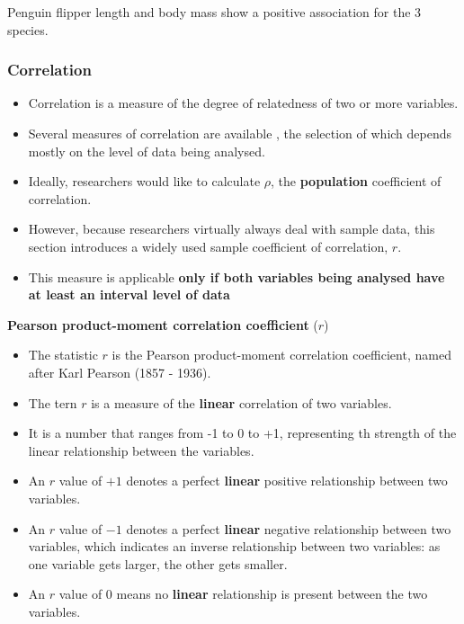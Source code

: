 \documentclass[]{book}
\providecommand{\tightlist}{%
  \setlength{\itemsep}{0pt}\setlength{\parskip}{0pt}}
\begin{document}
Penguin flipper length and body mass show a positive association for the 3 species.

\hypertarget{correlation-1}{%
\subsubsection{Correlation}\label{correlation-1}}

\begin{itemize}
\tightlist
\item
  Correlation is a measure of the degree of relatedness of two or more variables.
\item
  Several measures of correlation are available , the selection of which depends mostly on the level of data being analysed.
\item
  Ideally, researchers would like to calculate \(\rho\), the \textbf{population} coefficient of correlation.
\item
  However, because researchers virtually always deal with sample data, this section introduces a widely used sample coefficient of correlation, \(r\).
\item
  This measure is applicable \textbf{only if both variables being analysed have at least an interval level of data}
\end{itemize}

\textbf{Pearson product-moment correlation coefficient} (\(r\))

\begin{itemize}
\tightlist
\item
  The statistic \(r\) is the Pearson product-moment correlation coefficient, named after Karl Pearson (1857 - 1936).
\item
  The tern \(r\) is a measure of the \textbf{linear} correlation of two variables.
\item
  It is a number that ranges from -1 to 0 to +1, representing th strength of the linear relationship between the variables.
\item
  An \(r\) value of \(+1\) denotes a perfect \textbf{linear} positive relationship between two variables.
\item
  An \(r\) value of \(-1\) denotes a perfect \textbf{linear} negative relationship between two variables, which indicates an inverse relationship between two variables: as one variable gets larger, the other gets smaller.
\item
  An \(r\) value of 0 means no \textbf{linear} relationship is present between the two variables.
\end{itemize}
\end{document}
